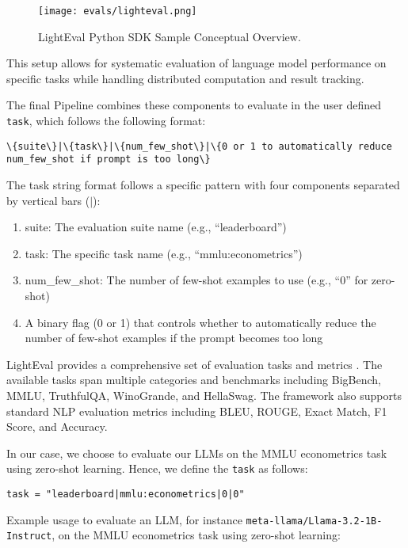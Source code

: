 \begin{figure}[h]
\centering
\texttt{[image: evals/lighteval.png]}
\caption{LightEval Python SDK Sample Conceptual Overview.}
\label{fig:lighteval}
\end{figure}

This setup allows for systematic evaluation of language model performance on specific tasks while handling distributed computation and result tracking.

The final Pipeline combines these components to evaluate in the user defined \texttt{task}, which follows the following format:

\begin{verbatim}
\{suite\}|\{task\}|\{num_few_shot\}|\{0 or 1 to automatically reduce num_few_shot if prompt is too long\}
\end{verbatim}

The task string format follows a specific pattern with four components separated by vertical bars ($|$):

\begin{enumerate}
\item suite: The evaluation suite name (e.g., ``leaderboard'')
\item task: The specific task name (e.g., ``mmlu:econometrics'') 
\item num\_few\_shot: The number of few-shot examples to use (e.g., ``0'' for zero-shot)
\item A binary flag (0 or 1) that controls whether to automatically reduce the number of few-shot examples if the prompt becomes too long
\end{enumerate}
LightEval provides a comprehensive set of evaluation tasks  and metrics . The available tasks span multiple categories and benchmarks including BigBench, MMLU, TruthfulQA, WinoGrande, and HellaSwag. The framework also supports standard NLP evaluation metrics including BLEU, ROUGE, Exact Match, F1 Score, and Accuracy.

In our case, we choose to evaluate our LLMs on the MMLU econometrics task using zero-shot learning. Hence, we define the \texttt{task} as follows:

\begin{verbatim}
task = "leaderboard|mmlu:econometrics|0|0"
\end{verbatim}

Example usage to evaluate an LLM, for instance \texttt{meta-llama/Llama-3.2-1B-Instruct}, on the MMLU econometrics task using zero-shot learning:

